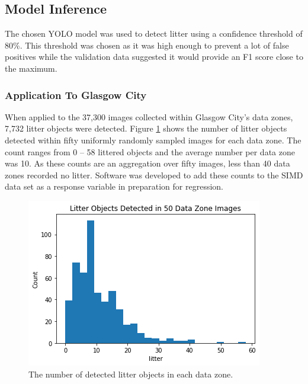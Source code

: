 \documentclass{thesis}
\begin{document}
\subsection{Model Inference}

The chosen YOLO model was used to detect litter using a confidence threshold of 80\%. This threshold was chosen as it was high enough to prevent a lot of false positives while the validation data suggested it would provide an F1 score close to the maximum.

\subsubsection{Application To Glasgow City}

When applied to the 37,300 images collected within Glasgow City's data zones, 7,732 litter objects were detected. Figure \ref{fig:litter-histogram} shows the number of litter objects detected within fifty uniformly randomly sampled images for each data zone. The count ranges from 0 -- 58 littered objects and the average number per data zone was 10. As these counts are an aggregation over fifty images, less than 40 data zones recorded no litter. Software was developed to add these counts to the SIMD data set as a response variable in preparation for regression.

\begin{figure}[h!]
    \centering
    \includegraphics[scale=0.6]{images/litter-hist.png}
    \caption{The number of detected litter objects in each data zone.}
    \label{fig:litter-histogram}
\end{figure}
\end{document}

